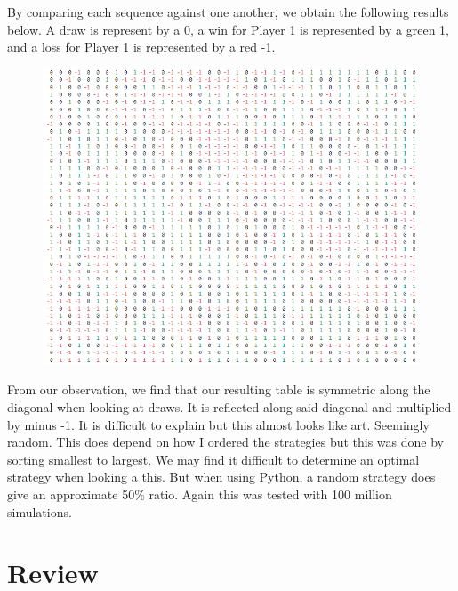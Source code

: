 \documentclass[11pt]{article}
\newcommand{\keywordfont}{\textsc}
\newcommand{\keyword}[1]{%
  \marginpar{\raggedright\small\keywordfont{#1}}}
\begin{document}
By comparing each \keyword{Try}sequence against one another, we obtain the following results below. A draw is represent by a 0, a win for Player 1 is represented by a green 1, and a loss for Player 1 is represented by a red -1.

\begin{figure}[h]
   \centering
   \includegraphics[width=6.15in]{beautiful.PNG}
   \label{myfig}
\end{figure}

From our observation, we find that our resulting table is symmetric along the diagonal when looking at draws. It is reflected along said diagonal and multiplied by minus -1. It is \keyword{Ooo} difficult to explain but this almost looks like art. Seemingly random. This does depend on how I ordered the strategies but this was done by sorting smallest to largest. We may find it difficult \keyword{Stuck} to determine an optimal strategy when looking a this. But when \keyword{Check} using Python, a random strategy does give an approximate 50\% ratio. Again this was tested with 100 million simulations.


\section{Review} %
\end{document}
